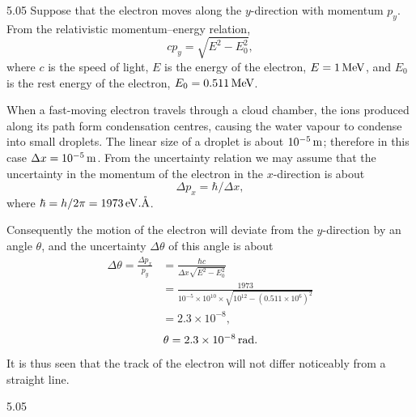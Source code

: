\begin{solution}{5.05}
Suppose that the electron moves along the $y$-direction with momentum $p_y$. From the
relativistic momentum--energy relation,
\begin{equation*}
cp_y = \sqrt{E^2 - E_0^2},
\end{equation*}
where $c$ is the speed of light, $E$ is the energy of the electron, $E = 1\,\mathrm{MeV}$, and
$E_0$ is the rest energy of the electron, $E_0 = 0.511\,\mathrm{MeV}$.

When a fast-moving electron travels through a cloud chamber, the ions produced along its path
form condensation centres, causing the water vapour to condense into small droplets. The
linear size of a droplet is about $10^{-5}\,\mathrm{m}$; therefore in this case
$\Delta x = 10^{-5}\,\mathrm{m}$. From the uncertainty relation we may assume that the
uncertainty in the momentum of the electron in the $x$-direction is about
\begin{equation*}
\Delta p_x = \hbar/\Delta x,
\end{equation*}
where $\hbar = h/2\pi = 1973\,\mathrm{eV.\mathring{A}}$.

Consequently the motion of the electron will deviate from the $y$-direction by an angle
$\theta$, and the uncertainty $\Delta\theta$ of this angle is about
\begin{align*}
\Delta\theta = \frac{\Delta p_x}{p_y}
&= \frac{\hbar c}{\Delta x\sqrt{E^2 - E_0^2}}\\
&= \frac{1973}{10^{-5}\times 10^{10}\times\sqrt{10^{12} - (0.511\times 10^6)^2}}\\
&= 2.3\times 10^{-8},
\end{align*}
\begin{equation*}
\theta = 2.3\times 10^{-8}\,\mathrm{rad}.
\end{equation*}
It is thus seen that the track of the electron will not differ noticeably from a straight
line.

\begin{figbox}{5.05}
\end{figbox}


\end{solution}
